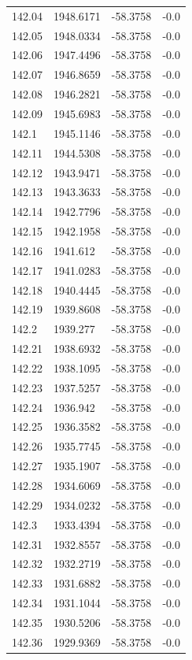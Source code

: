 \begin{table}[H]
\begin{tabular}{llll}
142.04 & 1948.6171 & -58.3758 & -0.0 \\
142.05 & 1948.0334 & -58.3758 & -0.0 \\
142.06 & 1947.4496 & -58.3758 & -0.0 \\
142.07 & 1946.8659 & -58.3758 & -0.0 \\
142.08 & 1946.2821 & -58.3758 & -0.0 \\
142.09 & 1945.6983 & -58.3758 & -0.0 \\
142.1 & 1945.1146 & -58.3758 & -0.0 \\
142.11 & 1944.5308 & -58.3758 & -0.0 \\
142.12 & 1943.9471 & -58.3758 & -0.0 \\
142.13 & 1943.3633 & -58.3758 & -0.0 \\
142.14 & 1942.7796 & -58.3758 & -0.0 \\
142.15 & 1942.1958 & -58.3758 & -0.0 \\
142.16 & 1941.612 & -58.3758 & -0.0 \\
142.17 & 1941.0283 & -58.3758 & -0.0 \\
142.18 & 1940.4445 & -58.3758 & -0.0 \\
142.19 & 1939.8608 & -58.3758 & -0.0 \\
142.2 & 1939.277 & -58.3758 & -0.0 \\
142.21 & 1938.6932 & -58.3758 & -0.0 \\
142.22 & 1938.1095 & -58.3758 & -0.0 \\
142.23 & 1937.5257 & -58.3758 & -0.0 \\
142.24 & 1936.942 & -58.3758 & -0.0 \\
142.25 & 1936.3582 & -58.3758 & -0.0 \\
142.26 & 1935.7745 & -58.3758 & -0.0 \\
142.27 & 1935.1907 & -58.3758 & -0.0 \\
142.28 & 1934.6069 & -58.3758 & -0.0 \\
142.29 & 1934.0232 & -58.3758 & -0.0 \\
142.3 & 1933.4394 & -58.3758 & -0.0 \\
142.31 & 1932.8557 & -58.3758 & -0.0 \\
142.32 & 1932.2719 & -58.3758 & -0.0 \\
142.33 & 1931.6882 & -58.3758 & -0.0 \\
142.34 & 1931.1044 & -58.3758 & -0.0 \\
142.35 & 1930.5206 & -58.3758 & -0.0 \\
142.36 & 1929.9369 & -58.3758 & -0.0 \\

\end{tabular}
\end{table}
